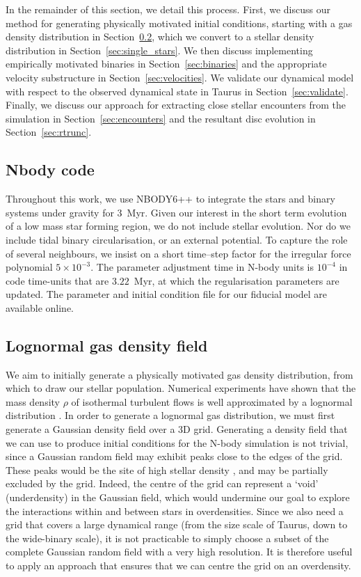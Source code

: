 \documentclass{aa}
\begin{document}
In the remainder of this section, we detail this process. First, we discuss our method for generating physically motivated initial conditions, starting with a gas density distribution in Section~\ref{sec:gas_density}, which we convert to a stellar density distribution in Section~\ref{sec:single_stars}. We then discuss implementing empirically motivated binaries in Section~\ref{sec:binaries} and the appropriate velocity substructure in Section~\ref{sec:velocities}. We validate our dynamical model with respect to the observed dynamical state in Taurus in Section~\ref{sec:validate}. Finally, we discuss our approach for extracting close stellar encounters from the simulation in Section~\ref{sec:encounters} and the resultant disc evolution in Section~\ref{sec:rtrunc}. 


\subsection{Nbody code}
\label{sec:nbodycode}
Throughout this work, we use \textsc{NBODY6++} \citep{Aarseth03,Spurzem99, Wang15} to integrate the stars and binary systems under gravity for $3$~Myr. Given our interest in the short term evolution of a low mass star forming region, we do not include stellar evolution. Nor do we include tidal binary circularisation, or an external potential. To capture the role of several neighbours, we insist on a short time–step factor for the irregular force polynomial $5\times 10^{-3}$. The parameter adjustment time in N-body units is $10^{-4}$ in code time-units that are $3.22$~Myr, {at which the regularisation parameters are updated}. The parameter and initial condition file for our fiducial model are available online. 


\subsection{Lognormal gas density field}
\label{sec:gas_density}
We aim to initially generate a physically motivated gas density distribution, from which to draw our stellar population. Numerical experiments have shown that the mass density $\rho$ of isothermal turbulent flows is well approximated by a lognormal distribution \citep[e.g.][]{VazquezSemadeni94, Nordlund99, Ostriker99}. In order to generate a lognormal gas distribution, we must first generate a Gaussian density field over a 3D grid. Generating a density field that we can use to produce initial conditions for the N-body simulation is not trivial, since a Gaussian random field may exhibit peaks close to the edges of the grid. These peaks would be the site of high stellar density \citep[or `NESTS' --][]{Joncour18}, and may be partially excluded by the grid. Indeed, the centre of the grid can represent a `void' (underdensity) in the Gaussian field, which would undermine our goal to explore the interactions within and between stars in overdensities. Since we also need a grid that covers a large dynamical range (from the size scale of Taurus, down to the wide-binary scale), it is not practicable to simply choose a subset of the complete Gaussian random field with a very high resolution. It is therefore useful to apply an approach that ensures that we can centre the grid on an overdensity. 
\end{document}
